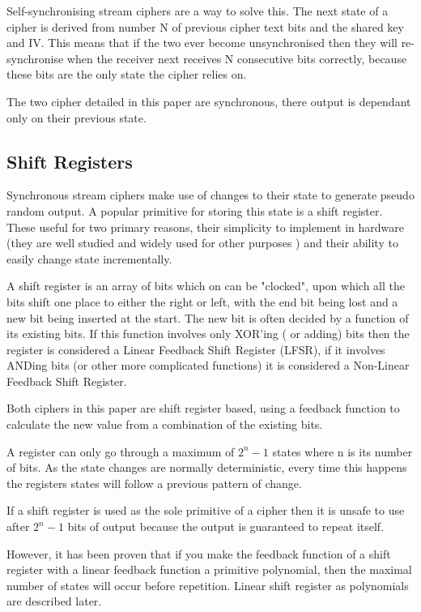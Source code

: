 \documentclass{report}
\let\Oldsubsection\subsection
\renewcommand{\subsection}{\FloatBarrier\Oldsubsection}
\begin{document}
Self-synchronising stream ciphers are a way to solve this. The next state of a cipher is derived from number N of previous cipher text bits and the shared key and IV. This means that if the two ever become unsynchronised then they will re-synchronise when the receiver next receives N consecutive bits correctly, because these bits are the only state the cipher relies on.

The two cipher detailed in this paper are synchronous, there output is dependant only on their previous state.

\subsection*{Shift Registers}
Synchronous stream ciphers make use of changes to their state to generate pseudo random output. A popular primitive for storing this state is a shift register. These useful for two primary reasons, their simplicity to implement in hardware (they are well studied and widely used for other purposes%
) and their ability to easily change state incrementally.

A shift register is an array of bits which on can be "clocked", upon which all the bits shift one place to either the right or left, with the end bit being lost and a new bit being inserted at the start. The new bit is often decided by a function of its existing bits. If this function involves only XOR'ing ( or adding) bits then the register is considered a Linear Feedback Shift Register (LFSR), if it involves ANDing bits (or other more complicated functions) it is considered a Non-Linear Feedback Shift Register. 

Both ciphers in this paper are shift register based, using a feedback function to calculate the new value from a combination of the existing bits.

A register can only go through a maximum of $2^n-1$ states where n is its number of bits. As the state changes are normally deterministic, every time this happens the registers states will follow a previous pattern of change.

If a shift register is used as the sole primitive of a cipher then it is unsafe to use after $2^n-1$ bits of output because the output is guaranteed to repeat itself.

However, it has been proven that if you make the feedback function of a shift register with a linear feedback function a primitive polynomial, then the maximal number of states will occur before repetition. Linear shift register as polynomials are described later. %
\end{document}

